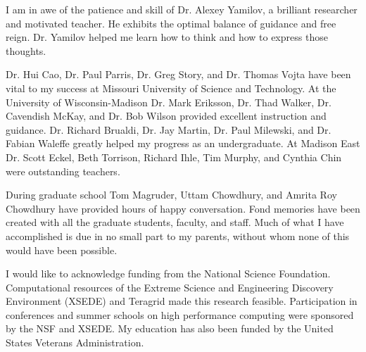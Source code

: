 
I am in awe of the patience and skill of Dr. Alexey Yamilov, a brilliant researcher and motivated teacher. He exhibits the optimal balance of guidance and free reign. %
Dr. Yamilov helped me learn how to think and how to express those thoughts.

Dr. Hui Cao, Dr. Paul Parris, Dr. Greg Story, and Dr. Thomas Vojta have been vital to my success at Missouri University of Science and Technology. 
At the University of Wisconsin-Madison 
Dr. Mark Eriksson, %
Dr. Thad Walker, %
Dr. Cavendish McKay, %
and 
Dr. Bob Wilson %
provided excellent instruction and guidance. 
Dr. Richard Brualdi, %
Dr. Jay Martin, %
Dr. Paul Milewski, %
and 
Dr. Fabian Waleffe %
greatly helped my progress as an undergraduate. 
At Madison East 
Dr. Scott Eckel, %
Beth Torrison, %
Richard Ihle, 
Tim Murphy, %
and 
Cynthia Chin %
were outstanding teachers.

During graduate school Tom Magruder, %
Uttam Chowdhury, and Amrita Roy Chowdhury have provided hours of happy conversation. Fond memories have been created with all the graduate students, faculty, and staff. Much of what I have accomplished is due in no small part to my parents, without whom none of this would have been possible. 

I would like to acknowledge funding from the National Science Foundation. Computational resources of the Extreme Science and Engineering Discovery Environment (XSEDE) and Teragrid made this research feasible. Participation in conferences and summer schools on high performance computing were sponsored by the NSF and XSEDE. 
My education has also been funded by the United States Veterans Administration.
